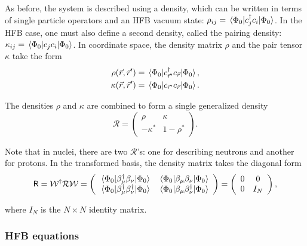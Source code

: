 As before, the system is described using a density, which can be written in terms of single particle operators and an HFB vacuum state: $\rho_{ij} = \expval{c_j^\dagger c_i}{\Phi_0}$. In the HFB case, one must also define a second density, called the pairing density: $\kappa_{ij} = \expval{c_jc_i}{\Phi_0}$. %
In coordinate space, the density matrix $\rho$ and the pair tensor $\kappa$ take the form
\begin{align}
\rho(\vec{r},\vec{r}') &= \expval{c_{\vec{r}'}^\dagger c_{\vec{r}}}{\Phi_0}, \\
\kappa(\vec{r},\vec{r}') &= \expval{c_{\vec{r}'} c_{\vec{r}}}{\Phi_0}.
\end{align}

\noindent The densities $\rho$ and $\kappa$ are combined to form a single generalized density
\begin{equation}
\mathcal{R} = \left(\begin{array}{cc}
\rho & \kappa \\
-\kappa^* & 1-\rho^*
\end{array}\right).
\end{equation}

\noindent Note that in nuclei, there are two $\mathcal{R}$'s: one for describing neutrons and another for protons. In the transformed basis, the density matrix takes the diagonal form 
\begin{equation}
\mathsf{R} = \mathcal{W}^\dagger\mathcal{R}\mathcal{W} = 
\left(\begin{array}{cc}
\expval{\beta_\mu^\dagger \beta_\nu}{\Phi_0} & \expval{\beta_\mu \beta_\nu}{\Phi_0} \\
\expval{\beta_\mu^\dagger \beta_\nu^\dagger}{\Phi_0} & \expval{\beta_\mu \beta_\nu^\dagger}{\Phi_0}
\end{array}\right) = 
\left(\begin{array}{cc}
0 & 0 \\
0 & I_N
\end{array}\right),
\end{equation}

\noindent where $I_N$ is the $N\times N$ identity matrix.

\subsubsection{HFB equations}

